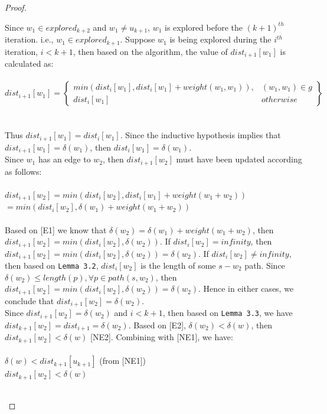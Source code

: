 \documentclass[11pt, oneside]{article}   	%
\newcommand\tab[1][1cm]{\hspace*{#1}}
\newcommand\ftab[1][5cm]{\hspace*{#1}}
\theoremstyle{definition}
\begin{document}
\begin{proof}
\begin{itemize}
\begin{enumerate}
  Since $w_1 \in explored_{k+2}$ and $w_1 \neq u_{k+1}$, $w_1$ is explored before the $(k+1)^{th}$ iteration. i.e., $w_1 \in explored_{k+1}$. Suppose $w_1$ is being explored during the $i^{th}$ iteration, $i < k+1$, then based on the algorithm, the value of $dist_{i+1}[w_1]$ is calculated as: 
  \\\\
  \tab\[
        dist_{i+1}[w_1] = \left.
       \begin{cases} 
          min(dist_{i}[w_1], dist_{i}[w_1] + weight(w_1,w_1)), & (w_1,w_1) \in g \\ 
          dist_{i}[w_1] & otherwise 
        \end{cases}
        \right\}
      \]
  \\\\
  Thus $dist_{i+1}[w_1] = dist_i[w_1]$. Since the inductive hypothesis implies that $dist_{i+1}[w_1] = \delta(w_1)$, then $dist_i[w_1] = \delta(w_1)$. 
  \\
  Since $w_1$ has an edge to $w_2$, then $dist_{i+1}[w_2]$ must have been updated according as follows: 
  \\\\
  \tab\tab $dist_{i+1}[w_2] = min(dist_i[w_2], dist_i[w_1] + weight(w_1 + w_2))$ \\
  \tab\tab\tab $= min(dist_i[w_2], \delta(w_1) + weight(w_1 + w_2))$
  \\\\
  Based on [E1] we know that $\delta(w_2) =  \delta(w_1) + weight(w_1 + w_2)$, then $dist_{i+1}[w_2] = min(dist_i[w_2], \delta(w_2))$. If $dist_i[w_2] = infinity$, then $dist_{i+1}[w_2] = min(dist_i[w_2], \delta(w_2)) = \delta(w_2)$. If $dist_i[w_2] \neq infinity$, then based on \texttt{Lemma 3.2}, $dist_i[w_2]$ is the length of some $s-w_2$ path. Since $\delta(w_2) \leq length(p), \forall p \in path(s, w_2)$, then $dist_{i+1}[w_2] = min(dist_i[w_2], \delta(w_2)) = \delta(w_2)$. Hence in either cases, we conclude that $dist_{i+1}[w_2] = \delta(w_2)$. 
  \\
  Since $dist_{i+1}[w_2] = \delta(w_2)$ and $i < k+1$, then based on \texttt{Lemma 3.3}, we have $dist_{k+1}[w_2] = dist_{i+1} = \delta(w_2)$. Based on [E2], $\delta(w_2) < \delta(w)$, then $dist_{k+1}[w_2] < \delta(w)$ [NE2]. Combining with [NE1], we have: 
  \\\\
  \ftab $\delta(w) < dist_{k+1}[u_{k+1}]$ (from [NE1])\\
  \ftab $dist_{k+1}[w_2] < \delta(w)$ 
  \\\\

\end{enumerate}
\end{itemize}
\end{proof}
\end{document}
